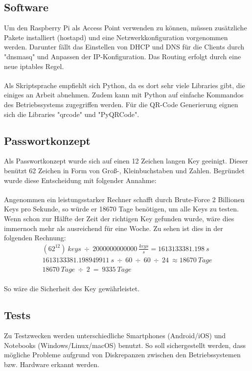 \documentclass[a4paper,11pt,singlespacing]{article}
\begin{document}
		\subsection{Software}
			Um den Raspberry Pi als Access Point verwenden zu können, müssen zusätzliche Pakete installiert (hostapd) und eine Netzwerkkonfiguration vorgenommen werden. Darunter fällt das Einstellen von DHCP und DNS für die Clients durch "dnsmasq" und Anpassen der IP-Konfiguration. Das Routing erfolgt durch eine neue iptables Regel.\\ \\
		
			Als Skriptsprache empfiehlt sich Python, da es dort sehr viele Libraries gibt, die einiges an Arbeit abnehmen. Zudem kann mit Python auf einfache Kommandos des Betriebssystems zugegriffen werden. Für die QR-Code Generierung eignen sich die Libraries "qrcode" und "PyQRCode". 
		
		\subsection{Passwortkonzept}
			Als Passwortkonzept wurde sich auf einen 12 Zeichen langen Key geeinigt. Dieser benützt 62 Zeichen in Form von Groß-, Kleinbuchstaben und Zahlen. Begründet wurde diese Entscheidung mit folgender Annahme: \\\\
			Angenommen ein leistungsstarker Rechner schafft durch Brute-Force 2 Billionen Keys pro Sekunde, so würde er 18670 Tage benötigen, um alle Keys zu testen.  Wenn schon zur Hälfte der Zeit der richtigen Key gefunden wurde, wäre dies immernoch mehr als ausreichend für eine Woche. Zu sehen ist dies in der folgenden Rechnung:
			\begin{eqnarray}
				(62^{12})\ keys\ \div\ 2000000000000\ \frac{keys}{s} =  1613133381.198\ s\\
				1613133381.198949911\ s\ \div\ 60\ \div\ 60\ \div\ 24\ \approx 18670 \ Tage\\
				18670\ Tage\ \div\ 2\ =\ 9335\ Tage
			\end{eqnarray}\\
		    So wäre die Sicherheit des Key gewährleistet.
	
		\subsection{Tests}
			Zu Testzwecken werden unterschiedliche Smartphones (Android/iOS) und Notebooks (Windows/Linux/macOS) benutzt. So soll sichergestellt werden, dass mögliche Probleme aufgrund von Diskrepanzen zwischen den Betriebssystemen bzw. Hardware erkannt werden.
		
\end{document}
